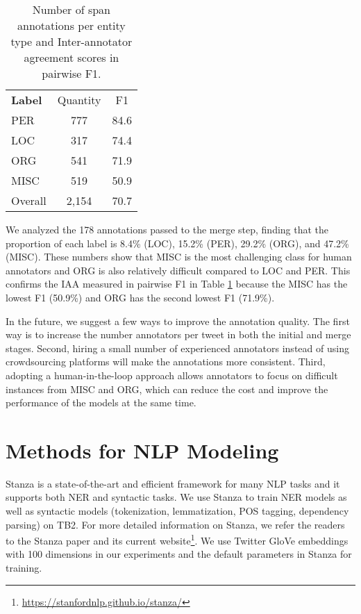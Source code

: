 \documentclass[10pt, a4paper]{article}
\begin{document}
\begin{table}[!ht]
\centering
\begin{tabular}{l|cc}
\textbf{Label}& Quantity & F1\\ \Xhline{2\arrayrulewidth}
PER & 777 & 84.6\\
LOC & 317 & 74.4 \\
ORG & 541 & 71.9 \\
MISC& 519 & 50.9 \\ 
\hline
Overall & 2,154 & 70.7
\end{tabular}
\caption{Number of span annotations per entity type and Inter-annotator agreement scores in pairwise F1.}
\label{tab:iaa}
\end{table}

We analyzed the 178 annotations passed to the merge step, finding that the proportion of each label is 8.4\% (LOC), 15.2\% (PER), 29.2\% (ORG), and 47.2\% (MISC). These numbers show that MISC is the most challenging class for human annotators and ORG is also relatively difficult compared to LOC and PER. This confirms the IAA measured in pairwise F1 in Table \ref{tab:iaa} because the MISC has the lowest F1 (50.9\%) and ORG has the second lowest F1 (71.9\%). 



In the future, we suggest a few ways to improve the annotation quality.  The first way is to increase the number annotators per tweet in both the initial and merge stages. Second, hiring a small number of experienced annotators instead of using crowdsourcing platforms will make the annotations more consistent. Third, adopting a human-in-the-loop approach allows annotators to focus on difficult instances from MISC and ORG, which can reduce the cost and improve the performance of the models at the same time. 





\section{Methods for NLP Modeling}

Stanza is a state-of-the-art and efficient framework for many NLP tasks \cite{qi2020stanza,zhang2021biomedical} and it supports both NER and syntactic tasks. We use Stanza to train NER models as well as syntactic models (tokenization, lemmatization, POS tagging, dependency parsing) on TB2. For more detailed information on Stanza, we refer the readers to the Stanza paper \cite{qi2020stanza} and its current website\footnote{\url{https://stanfordnlp.github.io/stanza/}}. We use Twitter GloVe embeddings \cite{pennington2014glove} with 100 dimensions in our experiments and the default parameters in Stanza for training. 
\end{document}
